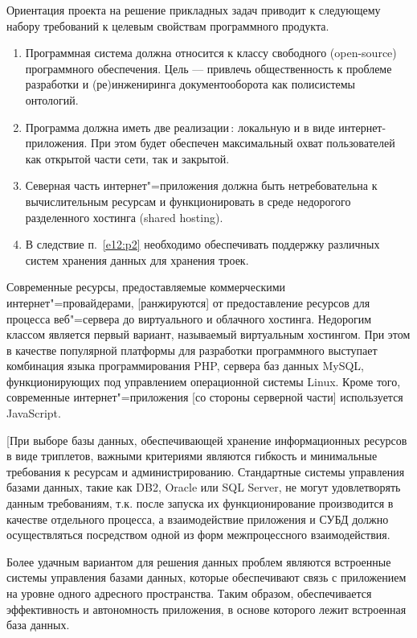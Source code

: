 \documentclass[utf8]{../IncArticle}
\newcommand{\e}[2][fcolor]{\textcolor{pcolor}{[}\textcolor{#1}{#2}\textcolor{pcolor}{]}}
\begin{document}
Ориентация проекта на решение прикладных задач приводит к следующему
набору требований к целевым свойствам программного продукта.
\begin{enumerate}
\item Программная система должна относится к классу свободного
  (open-source) программного обеспечения. Цель --- привлечь
  общественность к проблеме разработки и (ре)инжениринга
  документооборота как полисистемы онтологий.
\item Программа должна иметь две реализации\,: локальную и в виде
  интернет-приложения. При этом будет обеспечен максимальный охват
  пользователей как открытой части сети, так и закрытой.
\item Северная часть интернет"=приложения должна быть нетребовательна
  к вычислительным ресурсам и функционировать в среде недорогого
  разделенного хостинга (shared hosting).  \label{e12\,:p2}
\item В следствие п.~\ref{e12:p2} необходимо обеспечивать поддержку
  различных систем хранения данных для хранения троек.
\end{enumerate}

Современные ресурсы, предоставляемые коммерческими интернет"=провайдерами, \e{ранжируются} от предоставление ресурсов для процесса веб"=сервера до виртуального и облачного хостинга.  Недорогим классом является первый вариант, называемый виртуальным хостингом.  При этом в качестве популярной платформы для разработки программного выступает комбинация языка программирования PHP, сервера баз данных MySQL, функционирующих под управлением операционной системы Linux.  Кроме того, современные интернет"=приложения \e{со стороны серверной части} используется JavaScript.

[При выборе базы данных, обеспечивающей хранение информационных ресурсов в виде триплетов, важными критериями являются гибкость и минимальные требования к ресурсам и администрированию. Стандартные системы управления базами данных, такие как DB2, Oracle или SQL Server, не могут удовлетворять данным требованиям, т.к. после запуска их функционирование производится в качестве отдельного процесса, а взаимодействие приложения и СУБД должно осуществляться посредством одной из форм межпроцессного взаимодействия.

Более удачным вариантом для решения данных проблем являются встроенные системы управления базами данных, которые обеспечивают связь с приложением на уровне одного адресного пространства. Таким образом, обеспечивается эффективность и автономность приложения, в основе которого лежит встроенная база данных.
\end{document}
